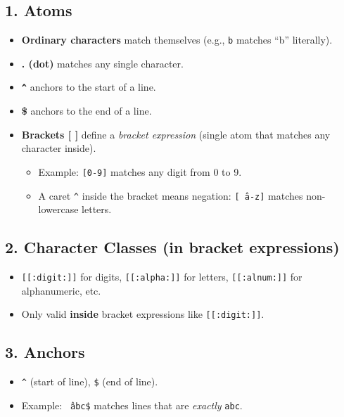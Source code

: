 \documentclass[a4paper]{report}
\begin{document}
\subsection*{1. Atoms}
\begin{itemize}
    \item \textbf{Ordinary characters} match themselves (e.g., \texttt{b} matches “b” literally).
    \item \textbf{. (dot)} matches any single character.
    \item \textbf{\texttt{\^}} anchors to the start of a line.
    \item \textbf{\$} anchors to the end of a line.
    \item \textbf{Brackets [ ]} define a \textit{bracket expression} (single atom that matches any character inside).
        \begin{itemize}
            \item Example: \texttt{[0-9]} matches any digit from 0 to 9.
            \item A caret \texttt{\^} inside the bracket means negation: \texttt{[\^ \ a-z]} matches non-lowercase letters.
        \end{itemize}
\end{itemize}

\subsection*{2. Character Classes (in bracket expressions)}
\begin{itemize}
    \item \texttt{[[:digit:]]} for digits, \texttt{[[:alpha:]]} for letters, \texttt{[[:alnum:]]} for alphanumeric, etc.
    \item Only valid \textbf{inside} bracket expressions like \texttt{[[:digit:]]}.
\end{itemize}

\subsection*{3. Anchors}
\begin{itemize}
    \item \texttt{\^} (start of line), \texttt{\$} (end of line).
    \item Example: \texttt{\^\ abc\$} matches lines that are \textit{exactly} \texttt{abc}.
\end{itemize}
\end{document}
